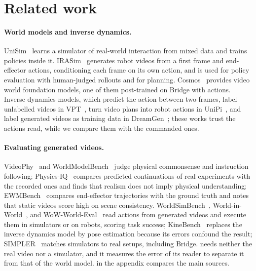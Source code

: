 \section{Related work}
\label{sec:study}

\paragraph{World models and inverse dynamics.}
UniSim~\cite{yang2023unisim} learns a simulator of real-world interaction from mixed data and trains policies inside it.
IRASim~\cite{zhu2024irasim} generates robot videos from a first frame and end-effector actions, conditioning each frame on its own action, and is used for policy evaluation with human-judged rollouts and for planning.
Cosmos~\cite{nvidia2025cosmos} provides video world foundation models, one of them post-trained on Bridge with actions.
Inverse dynamics models, which predict the action between two frames, label unlabelled videos in VPT~\cite{baker2022vpt}, turn video plans into robot actions in UniPi~\cite{du2023unipi}, and label generated videos as training data in DreamGen~\cite{jang2025dreamgen}; these works trust the actions read, while we compare them with the commanded ones.

\paragraph{Evaluating generated videos.}
VideoPhy~\cite{bansal2024videophy} and WorldModelBench~\cite{li2025worldmodelbench} judge physical commonsense and instruction following; Physics-IQ~\cite{motamed2025physicsiq} compares predicted continuations of real experiments with the recorded ones and finds that realism does not imply physical understanding; EWMBench~\cite{yue2025ewmbench} compares end-effector trajectories with the ground truth and notes that static videos score high on scene consistency.
WorldSimBench~\cite{qin2024worldsimbench}, World-in-World~\cite{zhang2026worldinworld}, and WoW-World-Eval~\cite{fan2026wowwoval} read actions from generated videos and execute them in simulators or on robots, scoring task success; KineBench~\cite{liu2026kinebench} replaces the inverse dynamics model by pose estimation because its errors confound the result; SIMPLER~\cite{li2024simpler} matches simulators to real setups, including Bridge.
\ours{} needs neither the real video nor a simulator, and it measures the error of its reader to separate it from that of the world model.
 in the appendix compares the main sources.

